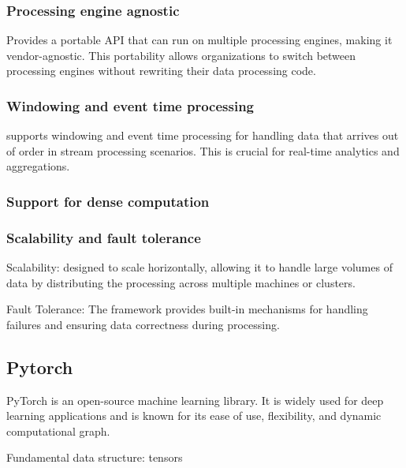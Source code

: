 \documentclass[11pt, reqno]{amsart}
\theoremstyle{definition}
\theoremstyle{remark}
\begin{document}
  \subsubsection{Processing engine agnostic}
  Provides a portable API that can run on multiple processing engines, making it
  vendor-agnostic. This portability allows organizations to switch between
  processing engines without rewriting their data processing code.

  \subsubsection{Windowing and event time processing}
  supports windowing and event time processing for handling data that arrives
  out of order in stream processing scenarios. This is crucial for real-time analytics
  and aggregations.

  \subsubsection{Support for dense computation}

  \subsubsection{Scalability and fault tolerance}
  Scalability: designed to scale horizontally, allowing it to handle large
  volumes of data by distributing the processing across multiple machines or
  clusters.

  Fault Tolerance: The framework provides built-in mechanisms for handling failures
  and ensuring data correctness during processing.

  \subsection{Pytorch}
  PyTorch is an open-source machine learning library. It is widely used for deep
  learning applications and is known for its ease of use, flexibility, and
  dynamic computational graph.

  Fundamental data structure: tensors
\end{document}
